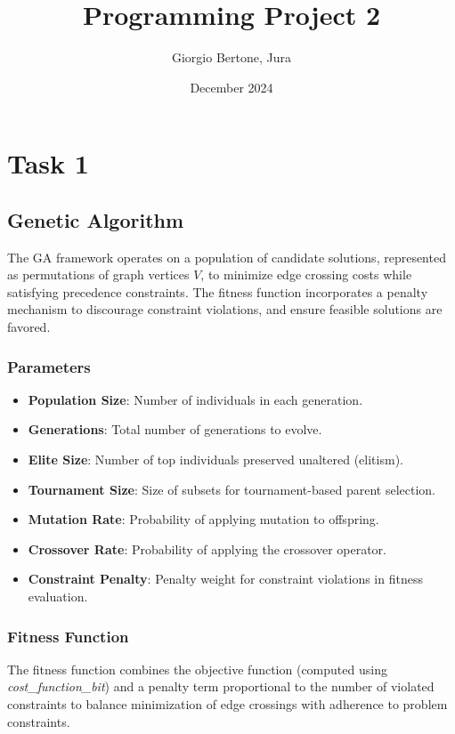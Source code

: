\documentclass{article}
\title{Programming Project 2}
\author{Giorgio Bertone, Jura }
\date{December 2024}
\begin{document}
\maketitle

\section{Task 1}
\subsection{Genetic Algorithm}

The GA framework operates on a population of candidate solutions, represented as permutations of graph vertices $V$, to minimize edge crossing costs while satisfying precedence constraints. The fitness function incorporates a penalty mechanism to discourage constraint violations, and ensure feasible solutions are favored.

\subsubsection*{Parameters}
\begin{itemize}
    \item \textbf{Population Size}: Number of individuals in each generation.
    \item \textbf{Generations}: Total number of generations to evolve.
    \item \textbf{Elite Size}: Number of top individuals preserved unaltered (elitism).
    \item \textbf{Tournament Size}: Size of subsets for tournament-based parent selection.
    \item \textbf{Mutation Rate}: Probability of applying mutation to offspring.
    \item \textbf{Crossover Rate}: Probability of applying the crossover operator.
    \item \textbf{Constraint Penalty}: Penalty weight for constraint violations in fitness evaluation.
\end{itemize}

\subsubsection*{Fitness Function}
The fitness function combines the objective function (computed using \textit{cost\_function\_bit}) and a penalty term proportional to the number of violated constraints to balance minimization of edge crossings with adherence to problem constraints.
\end{document}
